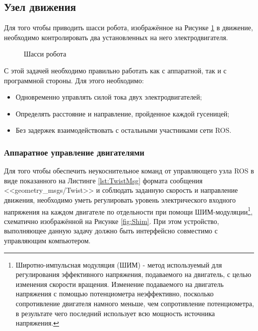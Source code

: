 \documentclass[12pt,a4paper]{scrartcl}
\begin{document}
			\subsection{Узел движения} \label{sec:Movement}
				Для того чтобы приводить шасси робота, изображённое на Рисунке \ref{fig:RobotChassis} в движение, необходимо контролировать два установленных на него электродвигателя. 
				
				\begin{figure}[h]
					\caption{Шасси робота}
					\label{fig:RobotChassis}
				\end{figure}
				
				С этой задачей необходимо правильно работать как с аппаратной, так и с программной стороны. Для этого необходимо:
				
				\begin{itemize}
					\item Одновременно управлять силой тока двух электродвигателей;
					\item Определять расстояние и направление, пройденное каждой гусеницей;
					\item Без задержек взаимодействовать с остальными участниками сети ROS.
				\end{itemize}
				
				\subsubsection{Аппаратное управление двигателями}
					Для того чтобы обеспечить неукоснительное команд от управляющего узла ROS в виде показанного на Листинге \ref{lst:TwistMsg}\cite{bib:ROSTwistMsg} формата сообщения <<geometry\_msgs/Twist>> и соблюдать заданную скорость и направление движения, необходимо уметь регулировать уровень электрического входного напряжения на каждом двигателе по отдельности при помощи ШИМ-модуляции\footnote{Широтно-импульсная модуляция (ШИМ) - метод используемый для регулирования эффективного напряжения, подаваемого на двигатель, с целью изменения скорости вращения. Изменение подаваемого на двигатель напряжения с помощью потенциометра неэффективно, посколько сопротивление двигателя намного меньше, чем сопротивление потенциометра, в результате чего последний использует всю мощность источника напряжения\cite{bib:Shim}.}, схематично изображённой на Рисунке \ref{fig:Shim}\cite{bib:Shim}. При этом устройство, выполняющее данную задачу должно быть интерфейсно совместимо с управляющим компьютером. 
					
\end{document}
